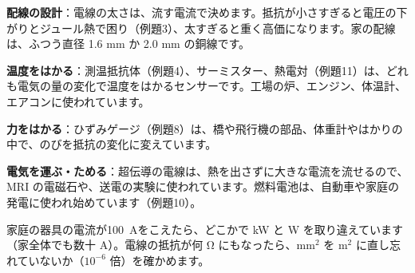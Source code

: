 \begin{phkougaku}[電流と抵抗の工学]
\textbf{配線の設計}：電線の太さは、流す電流で決めます。抵抗が小さすぎると電圧の下がりとジュール熱で困り（例題3）、太すぎると重く高価になります。家の配線は、ふつう直径 1.6 mm か 2.0 mm の銅線です。

\textbf{温度をはかる}：測温抵抗体（例題4）、サーミスター、熱電対（例題11）は、どれも電気の量の変化で温度をはかるセンサーです。工場の炉、エンジン、体温計、エアコンに使われています。

\textbf{力をはかる}：ひずみゲージ（例題8）は、橋や飛行機の部品、体重計やはかりの中で、のびを抵抗の変化に変えています。

\textbf{電気を運ぶ・ためる}：超伝導の電線は、熱を出さずに大きな電流を流せるので、MRI の電磁石や、送電の実験に使われています。燃料電池は、自動車や家庭の発電に使われ始めています（例題10）。

\begin{phketa}[電流と抵抗の数の目安]
家庭の器具の電流が\qty{100}{A}をこえたら、どこかで kW と W を取り違えています（家全体でも数十 A）。電線の抵抗が何 Ω にもなったら、mm$^2$ を m$^2$ に直し忘れていないか（$10^{-6}$ 倍）を確かめます。
\end{phketa}
\end{phkougaku}

